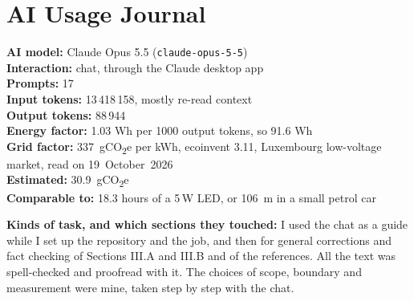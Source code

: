 \documentclass[conference,a4paper]{IEEEtran}
\newif\ifguidance
\newcommand{\guidance}[1]{\ifguidance{\itshape\small #1\par\medskip}\fi}
\begin{document}
\section{AI Usage Journal}
\guidance{For every AI model used: the model and its version, the total number
of prompts, the total input and output tokens, the estimated
gCO\textsubscript{2}e and how you got there, and a comparison with a familiar
activity. Convert with the course energy factor given in Session~7, applied to
your \emph{output} tokens, and the grid factor you declared in
Section~\ref{sec:lcia}. Cover every kind of AI use, chat assistants and agentic
tools alike.

Then, in prose: the kinds of task you asked the model for \emph{and which
sections of this paper they touched}, and a numbered list of \emph{every} piece
of wrong information it gave you, with how you spotted each one.

Naming the sections is what the University's assessment directive asks for: a
graded task must indicate, in a footnote or an appendix, which parts of it an AI
generated or influenced.

\textbf{The total you reach here is the numerator of
Section~\ref{sec:payback}}, so compute it before you write that section.

Copy the empty block below once per model and fill it in. The two entries that
follow it are worked examples. They disappear with the guidance.}

\noindent\textbf{AI model:} Claude Opus 5.5 (\texttt{claude-opus-5-5}) \\
\textbf{Interaction:} chat, through the Claude desktop app \\
\textbf{Prompts:} 17 \\
\textbf{Input tokens:} 13\,418\,158, mostly re-read context \\
\textbf{Output tokens:} 88\,944 \\
\textbf{Energy factor:} 1.03 Wh per 1000 output tokens, so 91.6 Wh \\
\textbf{Grid factor:} 337~gCO\textsubscript{2}e per kWh, ecoinvent 3.11,
Luxembourg low-voltage market, read on 19~October~2026 \\
\textbf{Estimated:} 30.9~gCO\textsubscript{2}e \\
\textbf{Comparable to:} 18.3 hours of a 5\,W LED, or 106~m in a small petrol
car~\cite{ries2026s2}

\textbf{Kinds of task, and which sections they touched:} I used the chat as a
guide while I set up the repository and the job, and then for general
corrections and fact checking of Sections III.A and III.B and of the
references. All the text was spell-checked and proofread with it. The choices
of scope, boundary and measurement were mine, taken step by step with the
chat.
\end{document}
